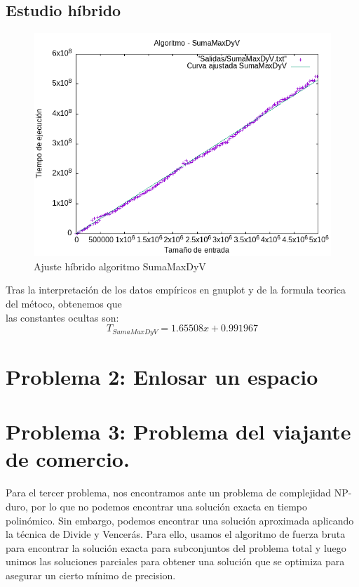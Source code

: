 \documentclass[11pt,openany]{book}
\begin{document}
\subsection{Estudio híbrido}
\begin{center}
      \begin{figure}[h]
            \centering
            \includegraphics[width=0.7\linewidth]{assets/Img/SumaMaxDyV_hib.png}
            \caption{Ajuste híbrido algoritmo SumaMaxDyV}
            \label{fig:sumaMax}
      \end{figure}
\end{center}
Tras la interpretación de los datos empíricos en gnuplot y de la formula teorica del métoco, obtenemos que \\
las constantes ocultas son:
\begin{equation*}
      T_{SumaMaxDyV}=1.65508x + 0.991967
\end{equation*}

\section{Problema 2: Enlosar un espacio }


\section{Problema 3: Problema del viajante de comercio.}
Para el tercer problema, nos encontramos ante un problema de complejidad
NP-duro, por lo que no podemos encontrar una solución exacta en tiempo polinómico.
Sin embargo, podemos encontrar una solución aproximada aplicando la técnica de Divide y Vencerás.
Para ello, usamos el algoritmo de fuerza bruta para encontrar la solución exacta para subconjuntos
del problema total y luego unimos las soluciones parciales para obtener una solución que se optimiza
para asegurar un cierto mínimo de precision.
\end{document}
